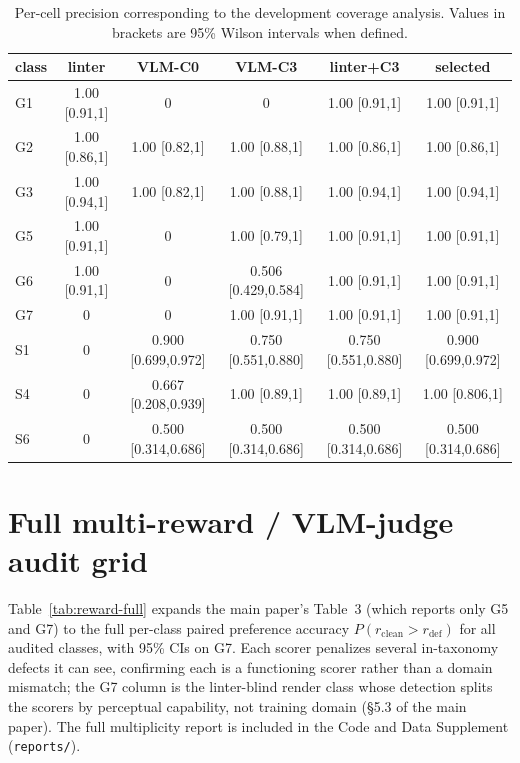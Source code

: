 \documentclass[11pt]{article}
\newcommand{\g}[1]{\textsf{#1}}
\begin{document}
\begin{table}[h]
\centering
\small
\setlength{\tabcolsep}{5pt}
\caption{Per-cell precision corresponding to the development coverage analysis. Values in brackets are 95\% Wilson intervals when defined.}
\label{tab:coverage-precision}
\begin{tabular}{@{}lccccc@{}}
\toprule
class & linter & VLM-C0 & VLM-C3 & linter+C3 & selected \\
\midrule
\g{G1} & 1.00 [0.91,1] & 0 & 0 & 1.00 [0.91,1] & 1.00 [0.91,1] \\
\g{G2} & 1.00 [0.86,1] & 1.00 [0.82,1] & 1.00 [0.88,1] & 1.00 [0.86,1] & 1.00 [0.86,1] \\
\g{G3} & 1.00 [0.94,1] & 1.00 [0.82,1] & 1.00 [0.88,1] & 1.00 [0.94,1] & 1.00 [0.94,1] \\
\g{G5} & 1.00 [0.91,1] & 0 & 1.00 [0.79,1] & 1.00 [0.91,1] & 1.00 [0.91,1] \\
\g{G6} & 1.00 [0.91,1] & 0 & 0.506 [0.429,0.584] & 1.00 [0.91,1] & 1.00 [0.91,1] \\
\g{G7} & 0 & 0 & 1.00 [0.91,1] & 1.00 [0.91,1] & 1.00 [0.91,1] \\
\g{S1} & 0 & 0.900 [0.699,0.972] & 0.750 [0.551,0.880] & 0.750 [0.551,0.880] & 0.900 [0.699,0.972] \\
\g{S4} & 0 & 0.667 [0.208,0.939] & 1.00 [0.89,1] & 1.00 [0.89,1] & 1.00 [0.806,1] \\
\g{S6} & 0 & 0.500 [0.314,0.686] & 0.500 [0.314,0.686] & 0.500 [0.314,0.686] & 0.500 [0.314,0.686] \\
\bottomrule
\end{tabular}
\end{table}

\section{Full multi-reward / VLM-judge audit grid}\label{app:reward}

Table~\ref{tab:reward-full} expands the main paper's Table~3 (which reports
only \g{G5} and \g{G7}) to the full per-class paired preference accuracy
$P(r_{\text{clean}}>r_{\text{def}})$ for all audited classes, with 95\% CIs on
\g{G7}. Each scorer penalizes several in-taxonomy defects it can see,
confirming each is a functioning scorer rather than a domain mismatch; the
\g{G7} column is the linter-blind render class whose detection splits the
scorers by perceptual capability, not training domain
(\S5.3 of the main paper). The full multiplicity report is included in the
Code and Data Supplement (\texttt{reports/}).
\end{document}

